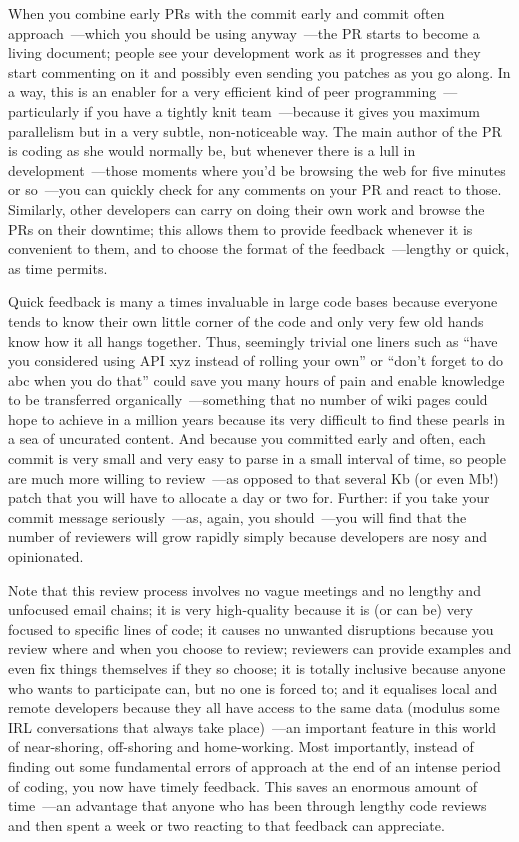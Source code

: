 \documentclass{book}
\begin{document}
When you combine early PRs with the commit early and commit often
approach~---which you should be using anyway~---the PR starts to become
a living document; people see your development work as it progresses
and they start commenting on it and possibly even sending you patches
as you go along. In a way, this is an enabler for a very efficient
kind of peer programming~---particularly if you have a tightly knit
team~---because it gives you maximum parallelism but in a very subtle,
non-noticeable way. The main author of the PR is coding as she would
normally be, but whenever there is a lull in development~---those
moments where you'd be browsing the web for five minutes or so~---you
can quickly check for any comments on your PR and react to
those. Similarly, other developers can carry on doing their own work
and browse the PRs on their downtime; this allows them to provide
feedback whenever it is convenient to them, and to choose the format
of the feedback~---lengthy or quick, as time permits.

Quick feedback is many a times invaluable in large code bases because
everyone tends to know their own little corner of the code and only
very few old hands know how it all hangs together. Thus, seemingly
trivial one liners such as ``have you considered using API xyz instead
of rolling your own'' or ``don't forget to do abc when you do that''
could save you many hours of pain and enable knowledge to be
transferred organically~---something that no number of wiki pages
could hope to achieve in a million years because its very difficult to
find these pearls in a sea of uncurated content. And because you
committed early and often, each commit is very small and very easy to
parse in a small interval of time, so people are much more willing to
review~---as opposed to that several Kb (or even Mb!) patch that you
will have to allocate a day or two for. Further: if you take your
commit message seriously~---as, again, you should~---you will find
that the number of reviewers will grow rapidly simply because
developers are nosy and opinionated.

Note that this review process involves no vague meetings and no
lengthy and unfocused email chains; it is very high-quality because it
is (or can be) very focused to specific lines of code; it causes no
unwanted disruptions because you review where and when you choose to
review; reviewers can provide examples and even fix things themselves
if they so choose; it is totally inclusive because anyone who wants to
participate can, but no one is forced to; and it equalises local and
remote developers because they all have access to the same data
(modulus some IRL conversations that always take place)~---an important
feature in this world of near-shoring, off-shoring and
home-working. Most importantly, instead of finding out some
fundamental errors of approach at the end of an intense period of
coding, you now have timely feedback. This saves an enormous amount of
time~---an advantage that anyone who has been through lengthy code
reviews and then spent a week or two reacting to that feedback can
appreciate.
\end{document}
